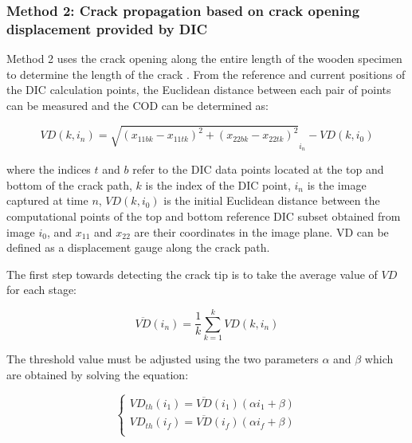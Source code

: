 \documentclass[3p,times,procedia]{elsarticle}
\begin{document}
\subsubsection{Method 2: Crack propagation based on crack opening displacement provided by DIC}

Method 2 uses the crack opening along the entire length of the wooden specimen to determine the length of the crack \citep{FilhoJ2022}. From the reference and current positions of the DIC calculation points, the Euclidean distance between each pair of points can be measured and the COD can be determined as:

\begin{equation}
	VD(k,i_n)=\sqrt{(x_{11bk}-x_{11tk})^2 + (x_{22bk}-x_{22tk})^2}_{i_n} - VD(k,i_0)
	\label{eq:eq23}
\end{equation}

\noindent where the indices $t$ and $b$ refer to the DIC data points located at the top and bottom of the crack path, $k$ is the index of the DIC point, $i_n$ is the image captured at time $n$, $VD(k, i_0)$ is the initial Euclidean distance between the computational points of the top and bottom reference DIC subset obtained from image $i_0$, and $x_{11}$ and $x_{22}$ are their coordinates in the image plane. VD can be defined as a displacement gauge along the crack path.



\noindent The first step towards detecting the crack tip is to take the average value of $VD$ for each stage:

\begin{equation}
	\overline{VD}(i_n)=\frac{1}{k} \sum_{k=1}^{k}VD(k,i_n)
	\label{eq:eq24}
\end{equation}

\noindent The threshold value must be adjusted using the two parameters $\alpha$ and $\beta$ which are obtained by solving the equation:

\begin{equation}
	\begin{cases}
		VD_{th}(i_1)=\overline{VD}(i_1)(\alpha i_1 +\beta)\\
		VD_{th}(i_f)=\overline{VD}(i_f)(\alpha i_f +\beta)\\ 
	\end{cases}
	\label{eq:eq25}
\end{equation}
\end{document}
